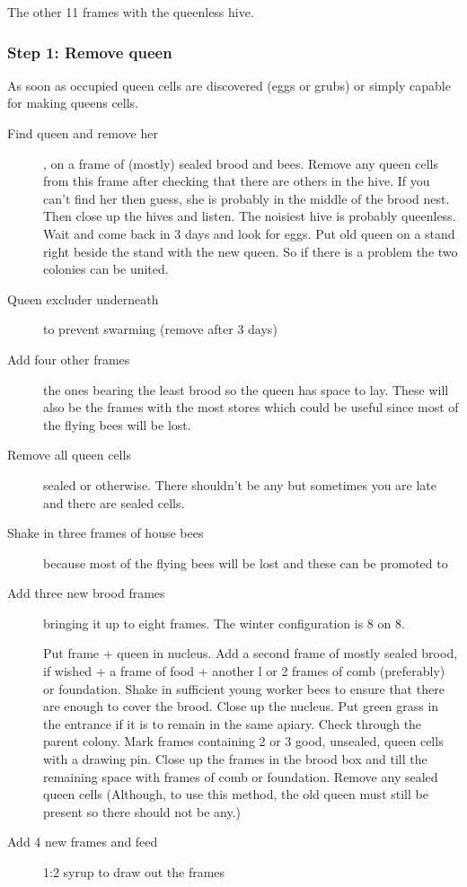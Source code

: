 The other 11 frames with the queenless hive.

\subsubsection*{Step 1: Remove queen}

As soon as occupied queen cells are discovered (eggs or grubs) or simply capable for making queens cells.

\begin{description}
  \item[Find queen and remove her], on a frame of (mostly) sealed brood and bees.
    Remove any queen cells from this frame after checking that there are others in the hive.
    If you can't find her  then guess, she is probably in the middle of the brood nest.
    Then close up the hives and listen.  The noisiest hive is probably queenless.
    Wait and come back in 3 days and look for eggs.
    Put old queen on a stand right beside the stand with the new queen.
  So if there is a problem the two colonies can be united.
  \item[Queen excluder underneath] to prevent swarming (remove after 3 days)
  \item[Add four other frames] the ones bearing the least brood so the queen has space to lay.
    These will also be the frames with the most stores which could be useful since most of the flying bees will be lost.
  \item[Remove all queen cells] sealed or otherwise.
    There shouldn't be any but sometimes you are late and there are sealed cells.
  \item[Shake in three frames of house bees] because most of the flying bees will be lost and these can be promoted to 
  \item[Add three new brood frames] bringing it up to eight frames.  The winter configuration is 8 on 8.
  
  
Put frame + queen in nucleus.
Add a second frame of mostly sealed brood, if wished + a frame of food + another l or 2
frames of comb (preferably) or foundation.
Shake in sufficient young worker bees to ensure that there are enough to cover the brood.
Close up the nucleus. Put green grass in the entrance if it is to remain in the same apiary.
Check through the parent colony.  Mark frames containing 2 or 3 good, unsealed, queen cells with a drawing pin.
Close up the frames in the brood box and till the remaining space with frames of comb or foundation.
  Remove any sealed queen cells (Although, to use this method, the old queen must still be present so there should not be any.)
  \item[Add 4 new frames and feed] 1:2 syrup to draw out the frames
\end{description}

